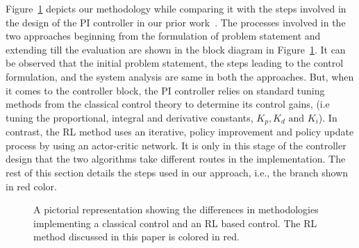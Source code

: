 Figure~\ref{fig:block_diagram}  depicts our methodology while comparing it with the steps involved in the design of the PI controller in our prior work~\cite{cerf2021sustaining}. The processes involved in the two approaches beginning from the formulation of problem statement and extending till the evaluation are shown in the block diagram in Figure~\ref{fig:block_diagram}. It can be observed that the initial problem statement, the steps leading to the control formulation, and the system analysis are same in both the approaches. But, when it comes to the controller block, the PI controller relies on standard tuning methods from the classical control theory to determine its control gains, (i.e tuning the proportional, integral and derivative constants, $K_p, K_d \text{ and } K_i$). In contrast, the RL method uses an iterative, policy improvement and policy update process by using an actor-critic network. 
It is only in this stage of the controller design that the two algorithms take different routes in the implementation. The rest of this section details the steps used in our approach, i.e., the branch shown in red color. 
\begin{figure}[htb]
\centering
{}
\caption{A pictorial representation showing the differences in methodologies implementing a classical control and an RL based control. The RL method discussed in this paper is colored in red.}
\label{fig:block_diagram}
\end{figure}
